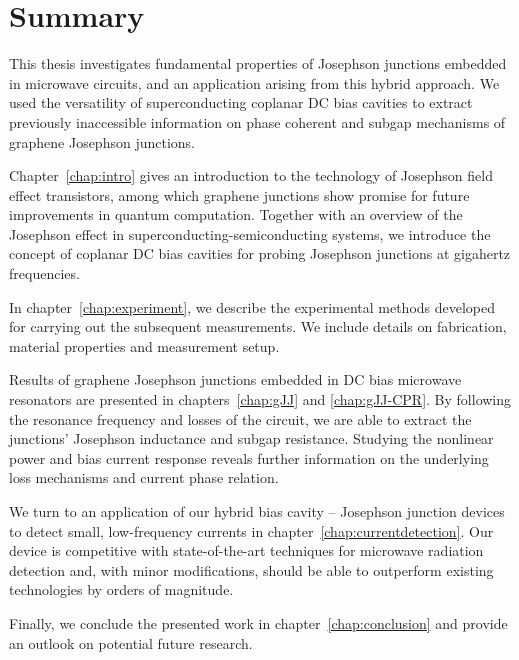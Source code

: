 \chapter*{Summary}

{%

This thesis investigates fundamental properties of Josephson junctions embedded in microwave circuits, and an application arising from this hybrid approach.
%
We used the versatility of superconducting coplanar DC bias cavities to extract previously inaccessible information on phase coherent and subgap mechanisms of graphene Josephson junctions.

\noindent \newline
Chapter~\ref{chap:intro} gives an introduction to the technology of Josephson field effect transistors, among which graphene junctions show promise for future improvements in quantum computation.
%
Together with an overview of the Josephson effect in superconducting-semiconducting systems, we introduce the concept of coplanar DC bias cavities for probing Josephson junctions at gigahertz frequencies.

\noindent \newline
In chapter~\ref{chap:experiment}, we describe the experimental methods developed for carrying out the subsequent measurements.
%
We include details on fabrication, material properties and measurement setup.

\noindent \newline
Results of graphene Josephson junctions embedded in DC bias microwave resonators are presented in chapters~\ref{chap:gJJ} and \ref{chap:gJJ-CPR}.
%
By following the resonance frequency and losses of the circuit, we are able to extract the junctions' Josephson inductance and subgap resistance.
%
Studying the nonlinear power and bias current response reveals further information on the underlying loss mechanisms and current phase relation.

\noindent \newline
We turn to an application of our hybrid bias cavity -- Josephson junction devices to detect small, low-frequency currents in chapter~\ref{chap:currentdetection}.
%
Our device is competitive with state-of-the-art techniques for microwave radiation detection and, with minor modifications, should be able to outperform existing technologies by orders of magnitude.

\noindent \newline
Finally, we conclude the presented work in chapter~\ref{chap:conclusion} and provide an outlook on potential future research.

}
\afterpage{\pagecolor{none}}

